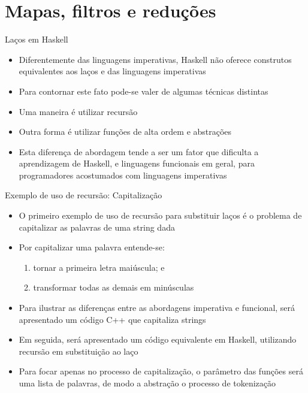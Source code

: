 \section{Mapas, filtros e reduções}

\begin{frame}[fragile]{Laços em Haskell}

    \begin{itemize}
        \item Diferentemente das linguagens imperativas, Haskell não oferece construtos equivalentes
            aos laços  e  das linguagens imperativas

        \item Para contornar este fato pode-se valer de algumas técnicas distintas

        \item Uma maneira é utilizar recursão

        \item Outra forma é utilizar funções de alta ordem e abstrações

        \item Esta diferença de abordagem tende a ser um fator que dificulta a 
            aprendizagem de Haskell, e linguagens funcionais em geral, para programadores
            acostumados com linguagens imperativas

    \end{itemize}

\end{frame}

\begin{frame}[fragile]{Exemplo de uso de recursão: Capitalização}

    \begin{itemize}
        \item O primeiro exemplo de uso de recursão para substituir laços é o problema de
            capitalizar as palavras de uma string dada

        \item Por capitalizar uma palavra entende-se:
        \begin{enumerate}
            \item tornar a primeira letra maiúscula; e
            \item transformar todas as demais em minúsculas
        \end{enumerate}

        \item Para ilustrar as diferenças entre as abordagens imperativa e funcional, será
            apresentado um código C++ que capitaliza strings

        \item Em seguida, será apresentado um código equivalente em Haskell, utilizando
            recursão em substituição ao laço

        \item Para focar apenas no processo de capitalização, o parâmetro das funções será uma
            lista de palavras, de modo a abstração o processo de tokenização
    \end{itemize}

\end{frame}

